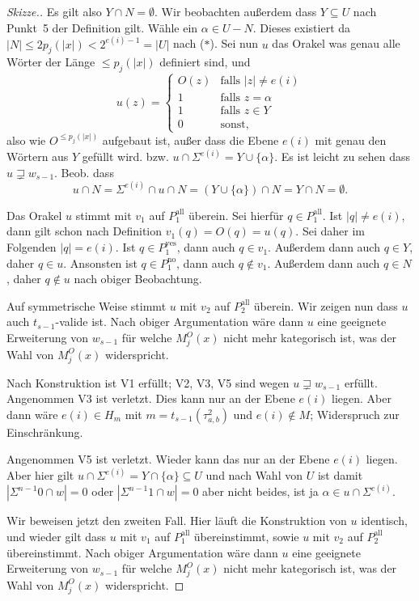 \documentclass[nofonts]{uebung}
\theoremstyle{definition}
\begin{document}
\begin{proof}[Skizze.]
    Es gilt also $Y\cap N =\emptyset$. Wir beobachten außerdem dass $Y\subseteq U$ nach Punkt~5 der Definition gilt. Wähle ein $\alpha\in U-N$. Dieses existiert da $|N|\leq 2p_j(|x|)<2^{e(i)-1} = |U|$ nach ($\ast$).
    Sei nun $u$ das Orakel was genau alle Wörter der Länge $\leq p_j(|x|)$ definiert sind, und
    \[ u(z)= \begin{cases} O(z) & \text{falls $|z|\neq e(i)$}\\ 1 & \text{falls $z=\alpha$} \\1 & \text{falls $z\in Y$} \\ 0&\text{sonst,} \end{cases}
    \]
    also wie $O^{\leq p_j(|x|)}$ aufgebaut ist, außer dass die Ebene $e(i)$ mit genau den Wörtern aus $Y$ gefüllt wird. bzw. $u\cap\Sigma^{e(i)} = Y\cup \{\alpha\}$.
    Es ist leicht zu sehen dass $u\sqsupsetneq w_{s-1}$.
    Beob. dass 
    \[ u\cap N = \Sigma^{e(i)}\cap u \cap N = (Y\cup \{\alpha\}) \cap N= Y\cap N=\emptyset.\]

    Das Orakel $u$ stimmt mit $v_1$ auf $P^\mathrm{all}_1$ überein. Sei hierfür $q\in P^\mathrm{all}_1$.
    Ist $|q|\neq e(i)$, dann gilt schon nach Definition $v_1(q)=O(q)=u(q)$. Sei daher im Folgenden $|q|=e(i)$.
    Ist $q\in P^\mathrm{yes}_1$, dann auch $q\in v_1$. Außerdem dann auch $q\in Y$, daher $q\in u$.
    Ansonsten ist $q\in P^\mathrm{no}_1$, dann auch $q\not\in v_1$. Außerdem dann auch $q\in N$, daher $q\not\in u$ nach obiger Beobachtung.
    
    Auf symmetrische Weise stimmt $u$ mit $v_2$ auf $P^\mathrm{all}_2$ überein.
    Wir zeigen nun dass $u$ auch $t_{s-1}$-valide ist.
    Nach obiger Argumentation wäre dann $u$ eine geeignete Erweiterung von $w_{s-1}$ für welche $M_j^O(x)$ nicht mehr kategorisch ist, was der Wahl von $M_j^O(x)$ widerspricht.

    Nach Konstruktion ist V1 erfüllt; V2, V3, V5 sind wegen $u\sqsupsetneq w_{s-1}$ erfüllt. Angenommen V3 ist verletzt. Dies kann nur an der Ebene $e(i)$ liegen. Aber dann wäre $e(i)\in H_{m}$ mit $m=t_{s-1}(\tau^2_{a,b})$ und $e(i) \not\in M$; Widerspruch zur Einschränkung.

    Angenommen V5 ist verletzt.
    Wieder kann das nur an der Ebene $e(i)$ liegen.
    Aber hier gilt $u\cap\Sigma^{e(i)}=Y\cap\{\alpha\}\subseteq U$ und nach Wahl von $U$ ist damit $|\Sigma^{n-1}0\cap w|=0$ oder $|\Sigma^{n-1}1\cap w|=0$ aber nicht beides, ist ja $\alpha\in u\cap\Sigma^{e(i)}$.
    \medskip

    Wir beweisen jetzt den zweiten Fall. Hier läuft die Konstruktion von $u$ identisch,
    und wieder gilt dass $u$ mit $v_1$ auf $P^\mathrm{all}_1$ übereinstimmt, sowie $u$ mit $v_2$ auf $P^\mathrm{all}_2$ übereinstimmt.
    Nach obiger Argumentation wäre dann $u$ eine geeignete Erweiterung von $w_{s-1}$ für welche $M_j^O(x)$ nicht mehr kategorisch ist, was der Wahl von $M_j^O(x)$ widerspricht.


\end{proof}
\end{document}
